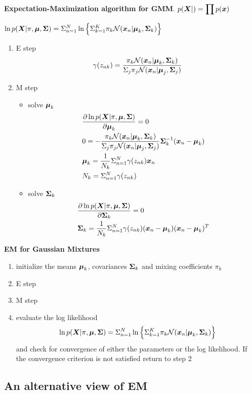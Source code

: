 \documentclass[11pt]{article}
\begin{document}
\textbf{Expectation-Maximization algorithm for GMM}. 
\(p(\boldsymbol{X}|)=\displaystyle\prod p(\boldsymbol{x})\)

\(\ln p(\boldsymbol{X}|\pi,\boldsymbol{\mu}, \boldsymbol{\Sigma})=\displaystyle\Sigma_{n=1}^N\ln\left\{
   \displaystyle\Sigma_{k=1}^K\pi_k\mathcal{N}(\boldsymbol{x}_n|\boldsymbol{\mu}_k,\boldsymbol{\Sigma}_k)\right\}\)
\begin{enumerate}
\item E step
\begin{equation*}
\gamma(z_{nk})=\frac{\pi_k\mathcal{N}(\boldsymbol{x}_n|\boldsymbol{\mu}_k,\boldsymbol{\Sigma}_k)}
{\displaystyle\Sigma_j\pi_j\mathcal{N}(\boldsymbol{x}_n|\boldsymbol{\mu}_j,\boldsymbol{\Sigma}_j)}
\end{equation*}
\item M step
\begin{itemize}
\item solve \(\boldsymbol{\mu}_k\)
\begin{align*}
&\frac{\partial\ln p(\boldsymbol{X}|\pi,\boldsymbol{\mu},\boldsymbol{\Sigma})}{\partial\boldsymbol{\mu}_k}=0\\
&0=-\frac{\pi_k\mathcal{N}(\boldsymbol{x}_n|\boldsymbol{\mu}_k,\boldsymbol{\Sigma}_k)}
{\displaystyle\Sigma_j\pi_j\mathcal{N}(\boldsymbol{x}_n|\boldsymbol{\mu}_j,\boldsymbol{\Sigma}_j)}\boldsymbol{\Sigma}_k^{-1}(\boldsymbol{x}_n-\boldsymbol{\mu}_k)\\
&\boldsymbol{\mu}_k=\frac{1}{N_k}\displaystyle\Sigma_{n=1}^N\gamma(z_{nk})\boldsymbol{x}_n\\
&N_k=\displaystyle\Sigma_{n=1}^N\gamma(z_{nk})
\end{align*}
\item solve \(\boldsymbol{\Sigma}_k\)
\begin{align*}
&\frac{\partial\ln p(\boldsymbol{X}|\pi,\boldsymbol{\mu},\boldsymbol{\Sigma})}{\partial\boldsymbol{\Sigma}_k}=0\\
&\boldsymbol{\Sigma}_k=\frac{1}{N_k}\displaystyle\Sigma_{n=1}^N\gamma(z_{nk})(\boldsymbol{x}_n-\boldsymbol{\mu}_k)(\boldsymbol{x}_n-\boldsymbol{\mu}_k)^T
\end{align*}
\end{itemize}
\end{enumerate}


\textbf{EM for Gaussian Mixtures}
\begin{enumerate}
\item initialize the means \(\boldsymbol{\mu}_k\), covariances \(\boldsymbol{\Sigma}_k\) and mixing
coefficients \(\pi_k\)
\item E step
\item M step
\item evaluate the log likelihood
\begin{equation*}
\ln p(\boldsymbol{X}|\pi,\boldsymbol{\mu}, \boldsymbol{\Sigma})=\displaystyle\Sigma_{n=1}^N\ln\left\{
\displaystyle\Sigma_{k=1}^K\pi_k\mathcal{N}(\boldsymbol{x}_n|\boldsymbol{\mu}_k,\boldsymbol{\Sigma}_k)\right\}
\end{equation*}
and check for convergence of either the parameters or the log likelihood.
If the convergence criterion is not satisfied return to step 2
\end{enumerate}
\subsection{An alternative view of EM}
\label{sec:org5230687}
\end{document}
